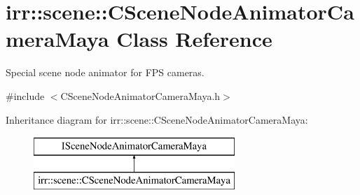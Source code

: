 \hypertarget{classirr_1_1scene_1_1_c_scene_node_animator_camera_maya}{\section{irr\-:\-:scene\-:\-:C\-Scene\-Node\-Animator\-Camera\-Maya Class Reference}
\label{classirr_1_1scene_1_1_c_scene_node_animator_camera_maya}
}


Special scene node animator for F\-P\-S cameras.  




{\ttfamily \#include $<$C\-Scene\-Node\-Animator\-Camera\-Maya.\-h$>$}

Inheritance diagram for irr\-:\-:scene\-:\-:C\-Scene\-Node\-Animator\-Camera\-Maya\-:\begin{figure}[H]
\begin{center}
\leavevmode
\includegraphics[height=2.000000cm]{classirr_1_1scene_1_1_c_scene_node_animator_camera_maya}
\end{center}
\end{figure}
